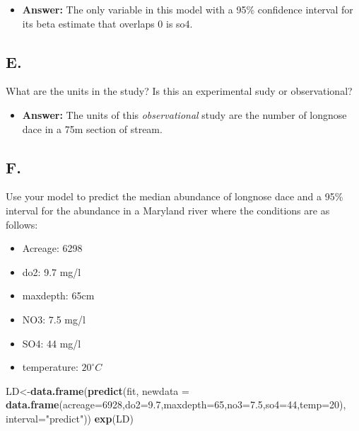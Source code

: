 \documentclass[]{article}
\newenvironment{Shaded}{\begin{snugshade}}{\end{snugshade}}
\newcommand{\KeywordTok}[1]{\textcolor[rgb]{0.13,0.29,0.53}{\textbf{#1}}}
\newcommand{\DataTypeTok}[1]{\textcolor[rgb]{0.13,0.29,0.53}{#1}}
\newcommand{\DecValTok}[1]{\textcolor[rgb]{0.00,0.00,0.81}{#1}}
\newcommand{\FloatTok}[1]{\textcolor[rgb]{0.00,0.00,0.81}{#1}}
\newcommand{\StringTok}[1]{\textcolor[rgb]{0.31,0.60,0.02}{#1}}
\newcommand{\NormalTok}[1]{#1}
\providecommand{\tightlist}{%
  \setlength{\itemsep}{0pt}\setlength{\parskip}{0pt}}
\begin{document}
\begin{itemize}
\tightlist
\item
  \textbf{Answer:} The only variable in this model with a 95\%
  confidence interval for its beta estimate that overlaps 0 is so4.
\end{itemize}

\subsection{E.}\label{e.-1}

What are the units in the study? Is this an experimental sudy or
observational?

\begin{itemize}
\tightlist
\item
  \textbf{Answer:} The units of this \emph{observational} study are the
  number of longnose dace in a 75m section of stream.
\end{itemize}

\subsection{F.}\label{f.}

Use your model to predict the median abundance of longnose dace and a
95\% interval for the abundance in a Maryland river where the conditions
are as follows:

\begin{itemize}
\tightlist
\item
  Acreage: 6298
\item
  do2: 9.7 mg/l
\item
  maxdepth: 65cm
\item
  NO3: 7.5 mg/l
\item
  SO4: 44 mg/l
\item
  temperature: \(20^\circ C\)
\end{itemize}

\begin{Shaded}
\begin{Highlighting}[]
\NormalTok{LD<-}\KeywordTok{data.frame}\NormalTok{(}\KeywordTok{predict}\NormalTok{(fit, }
        \DataTypeTok{newdata =} \KeywordTok{data.frame}\NormalTok{(}\DataTypeTok{acreage=}\DecValTok{6928}\NormalTok{,}\DataTypeTok{do2=}\FloatTok{9.7}\NormalTok{,}\DataTypeTok{maxdepth=}\DecValTok{65}\NormalTok{,}\DataTypeTok{no3=}\FloatTok{7.5}\NormalTok{,}\DataTypeTok{so4=}\DecValTok{44}\NormalTok{,}\DataTypeTok{temp=}\DecValTok{20}\NormalTok{),}
        \DataTypeTok{interval=}\StringTok{"predict"}\NormalTok{))}
\KeywordTok{exp}\NormalTok{(LD)}
\end{Highlighting}
\end{Shaded}
\end{document}
